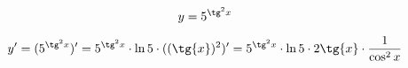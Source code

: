 {}

$$
 y = 5^{\tg^2{x}}
$$

$$
y' = (5^{\tg^2{x}})' = 5^{\tg^2{x}} \cdot \ln{5} \cdot ((\tg{x})^2)' = 5^{\tg^2{x}} \cdot \ln{5} \cdot 2 \tg{x} \cdot \dfrac{1}{\cos^2{x}}
$$
